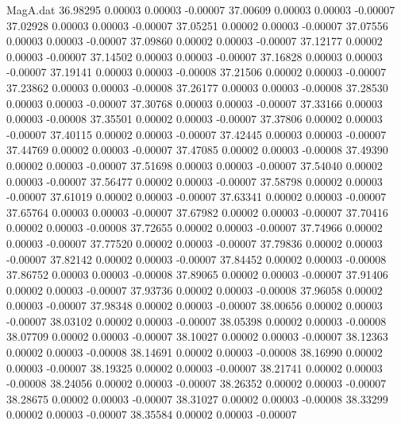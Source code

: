 \begin{filecontents}{MagA.dat}
  36.98295    0.00003    0.00003   -0.00007
  37.00609    0.00003    0.00003   -0.00007
  37.02928    0.00003    0.00003   -0.00007
  37.05251    0.00002    0.00003   -0.00007
  37.07556    0.00003    0.00003   -0.00007
  37.09860    0.00002    0.00003   -0.00007
  37.12177    0.00002    0.00003   -0.00007
  37.14502    0.00003    0.00003   -0.00007
  37.16828    0.00003    0.00003   -0.00007
  37.19141    0.00003    0.00003   -0.00008
  37.21506    0.00002    0.00003   -0.00007
  37.23862    0.00003    0.00003   -0.00008
  37.26177    0.00003    0.00003   -0.00008
  37.28530    0.00003    0.00003   -0.00007
  37.30768    0.00003    0.00003   -0.00007
  37.33166    0.00003    0.00003   -0.00008
  37.35501    0.00002    0.00003   -0.00007
  37.37806    0.00002    0.00003   -0.00007
  37.40115    0.00002    0.00003   -0.00007
  37.42445    0.00003    0.00003   -0.00007
  37.44769    0.00002    0.00003   -0.00007
  37.47085    0.00002    0.00003   -0.00008
  37.49390    0.00002    0.00003   -0.00007
  37.51698    0.00003    0.00003   -0.00007
  37.54040    0.00002    0.00003   -0.00007
  37.56477    0.00002    0.00003   -0.00007
  37.58798    0.00002    0.00003   -0.00007
  37.61019    0.00002    0.00003   -0.00007
  37.63341    0.00002    0.00003   -0.00007
  37.65764    0.00003    0.00003   -0.00007
  37.67982    0.00002    0.00003   -0.00007
  37.70416    0.00002    0.00003   -0.00008
  37.72655    0.00002    0.00003   -0.00007
  37.74966    0.00002    0.00003   -0.00007
  37.77520    0.00002    0.00003   -0.00007
  37.79836    0.00002    0.00003   -0.00007
  37.82142    0.00002    0.00003   -0.00007
  37.84452    0.00002    0.00003   -0.00008
  37.86752    0.00003    0.00003   -0.00008
  37.89065    0.00002    0.00003   -0.00007
  37.91406    0.00002    0.00003   -0.00007
  37.93736    0.00002    0.00003   -0.00008
  37.96058    0.00002    0.00003   -0.00007
  37.98348    0.00002    0.00003   -0.00007
  38.00656    0.00002    0.00003   -0.00007
  38.03102    0.00002    0.00003   -0.00007
  38.05398    0.00002    0.00003   -0.00008
  38.07709    0.00002    0.00003   -0.00007
  38.10027    0.00002    0.00003   -0.00007
  38.12363    0.00002    0.00003   -0.00008
  38.14691    0.00002    0.00003   -0.00008
  38.16990    0.00002    0.00003   -0.00007
  38.19325    0.00002    0.00003   -0.00007
  38.21741    0.00002    0.00003   -0.00008
  38.24056    0.00002    0.00003   -0.00007
  38.26352    0.00002    0.00003   -0.00007
  38.28675    0.00002    0.00003   -0.00007
  38.31027    0.00002    0.00003   -0.00008
  38.33299    0.00002    0.00003   -0.00007
  38.35584    0.00002    0.00003   -0.00007

\end{filecontents}

